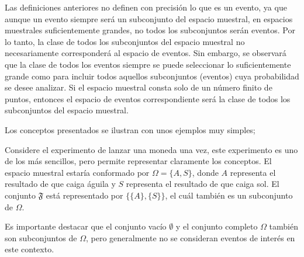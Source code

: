 \documentclass[
  us-letterpaper,
]{scrreprt}
\theoremstyle{plain}
\theoremstyle{definition}
\theoremstyle{definition}
\theoremstyle{plain}
\theoremstyle{remark}
\begin{document}
Las definiciones anteriores no definen con precisión lo que es un
evento, ya que aunque un evento siempre será un subconjunto del espacio
muestral, en espacios muestrales suficientemente grandes, no todos los
subconjuntos serán eventos. Por lo tanto, la clase de todos los
subconjuntos del espacio muestral no necesariamente corresponderá al
espacio de eventos. Sin embargo, se observará que la clase de todos los
eventos siempre se puede seleccionar lo suficientemente grande como para
incluir todos aquellos subconjuntos (eventos) cuya probabilidad se desee
analizar. Si el espacio muestral consta solo de un número finito de
puntos, entonces el espacio de eventos correspondiente será la clase de
todos los subconjuntos del espacio muestral.

Los conceptos presentados se ilustran con unos ejemplos muy simples;

\begin{tcolorbox}[enhanced jigsaw, breakable, colbacktitle=quarto-callout-caution-color!10!white, rightrule=.15mm, toptitle=1mm, colback=white, left=2mm, colframe=quarto-callout-caution-color-frame, bottomtitle=1mm, opacitybacktitle=0.6, leftrule=.75mm, arc=.35mm, title={Ejemplo (\textbf{\emph{Lanzamiento de una moneda}})}, coltitle=black, titlerule=0mm, opacityback=0, bottomrule=.15mm, toprule=.15mm]

Considere el experimento de lanzar una moneda una vez, este experimento
es uno de los más sencillos, pero permite representar claramente los
conceptos. El espacio muestral estaría conformado por
\(\Omega = \{A, S\}\), donde \(A\) representa el resultado de que caiga
águila y \(S\) representa el resultado de que caiga sol. El conjunto
\(\mathfrak{F}\) está representado por \(\{\{A\}, \{S\}\}\), el cuál
también es un subconjunto de \(\Omega\).

Es importante destacar que el conjunto vacío \(\emptyset\) y el conjunto
completo \(\Omega\) también son subconjuntos de \(\Omega\), pero
generalmente no se consideran eventos de interés en este contexto.

\end{tcolorbox}
\end{document}
